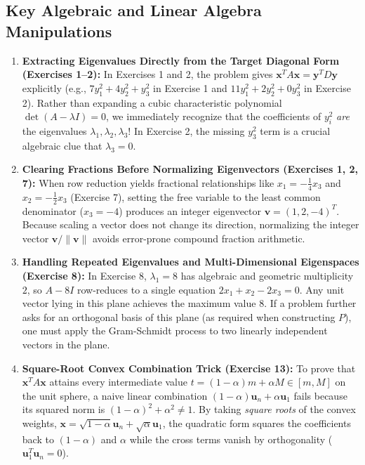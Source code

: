 \documentclass[11pt, letterpaper]{article}
\theoremstyle{definition}
\theoremstyle{remark}
\begin{document}
\subsection{Key Algebraic and Linear Algebra Manipulations}
\begin{enumerate}[label=\textbf{\arabic*.}]
    \item \textbf{Extracting Eigenvalues Directly from the Target Diagonal Form (Exercises 1--2):}
    In Exercises 1 and 2, the problem gives $\mathbf{x}^T A \mathbf{x} = \mathbf{y}^T D \mathbf{y}$ explicitly (e.g., $7y_1^2 + 4y_2^2 + y_3^2$ in Exercise 1 and $11y_1^2 + 2y_2^2 + 0y_3^2$ in Exercise 2). Rather than expanding a cubic characteristic polynomial $\det(A - \lambda I) = 0$, we immediately recognize that the coefficients of $y_i^2$ \emph{are} the eigenvalues $\lambda_1, \lambda_2, \lambda_3$! In Exercise 2, the missing $y_3^2$ term is a crucial algebraic clue that $\lambda_3 = 0$.
    \item \textbf{Clearing Fractions Before Normalizing Eigenvectors (Exercises 1, 2, 7):}
    When row reduction yields fractional relationships like $x_1 = -\frac{1}{4}x_3$ and $x_2 = -\frac{1}{2}x_3$ (Exercise 7), setting the free variable to the least common denominator ($x_3 = -4$) produces an integer eigenvector $\mathbf{v} = (1, 2, -4)^T$. Because scaling a vector does not change its direction, normalizing the integer vector $\mathbf{v}/\|\mathbf{v}\|$ avoids error-prone compound fraction arithmetic.
    \item \textbf{Handling Repeated Eigenvalues and Multi-Dimensional Eigenspaces (Exercise 8):}
    In Exercise 8, $\lambda_1 = 8$ has algebraic and geometric multiplicity $2$, so $A - 8I$ row-reduces to a single equation $2x_1 + x_2 - 2x_3 = 0$. Any unit vector lying in this plane achieves the maximum value $8$. If a problem further asks for an orthogonal basis of this plane (as required when constructing $P$), one must apply the Gram-Schmidt process to two linearly independent vectors in the plane.
    \item \textbf{Square-Root Convex Combination Trick (Exercise 13):}
    To prove that $\mathbf{x}^T A \mathbf{x}$ attains every intermediate value $t = (1-\alpha)m + \alpha M \in [m, M]$ on the unit sphere, a naive linear combination $(1-\alpha)\mathbf{u}_n + \alpha \mathbf{u}_1$ fails because its squared norm is $(1-\alpha)^2 + \alpha^2 \ne 1$. By taking \emph{square roots} of the convex weights, $\mathbf{x} = \sqrt{1-\alpha}\mathbf{u}_n + \sqrt{\alpha}\mathbf{u}_1$, the quadratic form squares the coefficients back to $(1-\alpha)$ and $\alpha$ while the cross terms vanish by orthogonality ($\mathbf{u}_1^T \mathbf{u}_n = 0$).

\end{enumerate}
\end{document}
